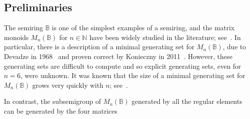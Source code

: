 \documentclass[11pt]{article}
\numberwithin{equation}{section}
\newcommand{\B}{\mathbb{B}}
\newcommand{\Bn}{M_n(\B)}
\newcommand{\N}{\mathbb{N}}
\begin{document}
\subsection{Preliminaries}
\label{sec:BMatPrelim}
The semiring $\B$ is one of the simplest examples of a semiring, and the matrix
monoids $\Bn$ for $n \in \N$ have been widely studied in the literature;
see~\cite{TODO}. In particular, there is a description of a minimal generating
set for $\Bn$, due to Devadze in 1968~\cite{Devadze1968aa} and proven correct by
Konieczny in 2011~\cite{Konieczny2011aa}. However, these generating sets are
difficult to compute and so explicit generating sets, even for $n = 6$, were
unknown. It was known that the size of a minimal generating set for $\Bn$ grows
very quickly with $n$; see~.

In contrast, the subsemigroup of $\Bn$ generated by all the regular elements can
be generated by the four matrices
\end{document}
